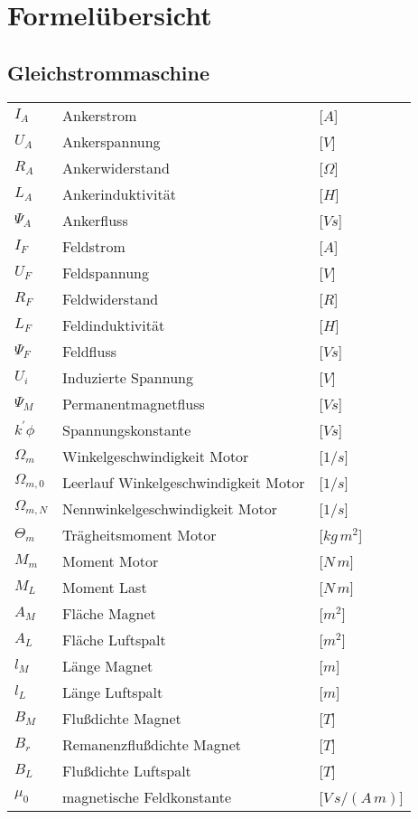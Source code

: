 	
	\tableofcontents %
	
	
	\section{Formelübersicht} %
	\subsection{Gleichstrommaschine} %
	\begin{tabular}{L{2cm}lR{2cm}}
		$I_A$  &Ankerstrom  &[$A$]\\
		$U_A$ &Ankerspannung & [$V$]\\
		$R_A$  &Ankerwiderstand &[$ \Omega $] \\
		$L_A$  &Ankerinduktivität &[$H$]\\
		$\Psi_A$ &Ankerfluss & [$Vs$]\\
		$I_F$ & Feldstrom & [$A$]\\
		$U_F$ & Feldspannung & [$V$]\\
		$R_F$ & Feldwiderstand & [$R$]\\
		$L_F$ & Feldinduktivität & [$H$]\\
		$\Psi_F$ &Feldfluss & [$Vs$]\\
		$U_i$ &Induzierte Spannung & [$V$]\\
		$\Psi_M$ &Permanentmagnetfluss & [$Vs$]\\
		$k^{'} \phi$ &Spannungskonstante & [$Vs$]\\
		$\Omega_m$ &Winkelgeschwindigkeit Motor & [$1/s$]\\
		$\Omega_{m,0}$ &Leerlauf Winkelgeschwindigkeit Motor & [$1/s$]\\
		$\Omega_{m,N}$ &Nennwinkelgeschwindigkeit Motor & [$1/s$]\\
		$\Theta_m$ &Trägheitsmoment Motor & [$kg \, m^{2}$]\\
		$M_m$ &Moment Motor & [$N\,m$]\\
		$M_L$ &Moment Last & [$N\,m$]\\
		$A_M$ &Fläche Magnet & [$m^{2}$]\\
		$A_L$ &Fläche Luftspalt & [$m^{2}$]\\
		$l_M$ &Länge Magnet & [$m$]\\
		$l_L$ &Länge Luftspalt & [$m$]\\
		$B_M$ &Flußdichte Magnet & [$T$]\\
		$B_r$ &Remanenzflußdichte Magnet & [$T$]\\
		$B_L$ &Flußdichte Luftspalt & [$T$]\\
		$\mu_0$ &magnetische Feldkonstante & [$V\,s/ (A \, m)$]\\
	\end{tabular}\\
